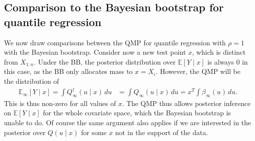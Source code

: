 \documentclass[11pt,a4paper]{article}
\newcommand{\E}{\mathbb{E}}
\begin{document}
\begin{appendices}
\subsection{Comparison to the Bayesian bootstrap for quantile regression}
We now draw comparisons between the QMP for quantile regression with $\rho = 1$ with the Bayesian bootstrap.
Consider now a new test point $x$, which is distinct from $X_{1:n}$. Under the BB, the posterior distribution over $\E[Y \mid x]$ is always 0 in this case, as the BB only allocates mass to $x = X_i$. However, the QMP will be the distribution of
\begin{align*}
   \E_\infty[ Y \mid x] =   \int Q^{\dagger}_{\infty}(u\mid x) \, du &=  \int Q_{\infty}(u\mid x) \, du=x^T\int \beta_{\infty}(u)\, du.
\end{align*}
This is thus non-zero for all values of $x$. The QMP thus allows posterior inference on $\E[Y \mid x]$ for the whole covariate space, which the Bayesian bootstrap is unable to do. Of course the same argument also applies if we are interested in the posterior over $Q(u \mid x)$ for some $x$ not in the support of the data. 



% 
% 
    
\end{appendices}
\end{document}
